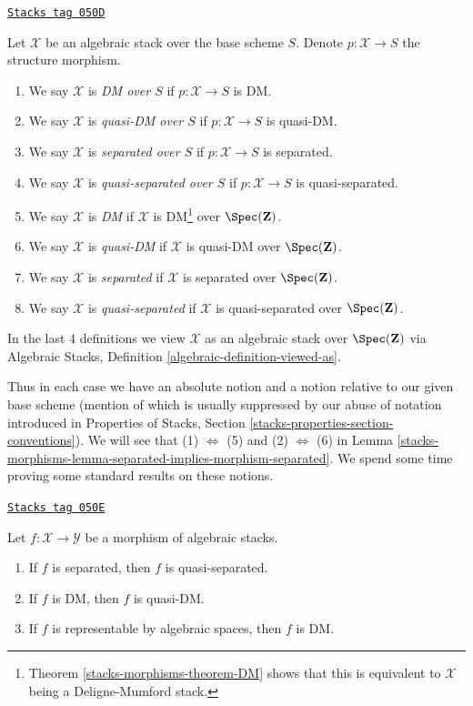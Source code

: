 \begin{definition}
\label{stacks-morphisms-definition-absolute-separated}
\href{https://stacks.math.columbia.edu/tag/050D}{\texttt{Stacks tag 050D}}

Let $\mathcal{X}$ be an algebraic stack over the base scheme $S$.
Denote $p : \mathcal{X} \to S$ the structure morphism.
\begin{enumerate}
\item We say $\mathcal{X}$ is {\it DM over $S$}
if $p : \mathcal{X} \to S$ is DM.
\item We say $\mathcal{X}$ is {\it quasi-DM over $S$}
if $p : \mathcal{X} \to S$ is quasi-DM.
\item We say $\mathcal{X}$ is {\it separated over $S$}
if $p : \mathcal{X} \to S$ is separated.
\item We say $\mathcal{X}$ is {\it quasi-separated over $S$} if
$p : \mathcal{X} \to S$ is quasi-separated.
\item We say $\mathcal{X}$ is {\it DM}
if $\mathcal{X}$ is DM\footnote{Theorem \ref{stacks-morphisms-theorem-DM} shows
that this is equivalent to $\mathcal{X}$ being a Deligne-Mumford stack.}
over $\Spec(\mathbf{Z})$.
\item We say $\mathcal{X}$ is {\it quasi-DM}
if $\mathcal{X}$ is quasi-DM over $\Spec(\mathbf{Z})$.
\item We say $\mathcal{X}$ is {\it separated} if $\mathcal{X}$
is separated over $\Spec(\mathbf{Z})$.
\item We say $\mathcal{X}$ is {\it quasi-separated} if $\mathcal{X}$
is quasi-separated over $\Spec(\mathbf{Z})$.
\end{enumerate}
In the last 4 definitions we view $\mathcal{X}$
as an algebraic stack over $\Spec(\mathbf{Z})$
via
Algebraic Stacks, Definition \ref{algebraic-definition-viewed-as}.
\end{definition}

Thus in each case we have an absolute notion and a notion relative to
our given base scheme (mention of which is usually suppressed by our
abuse of notation introduced in
Properties of Stacks, Section \ref{stacks-properties-section-conventions}).
We will see that (1) $\Leftrightarrow$ (5) and (2) $\Leftrightarrow$ (6) in
Lemma \ref{stacks-morphisms-lemma-separated-implies-morphism-separated}.
We spend some time proving some standard results on these notions.

\begin{lemma}
\label{stacks-morphisms-lemma-trivial-implications}
\href{https://stacks.math.columbia.edu/tag/050E}{\texttt{Stacks tag 050E}}

Let $f : \mathcal{X} \to \mathcal{Y}$ be a morphism of algebraic stacks.
\begin{enumerate}
\item If $f$ is separated, then $f$ is quasi-separated.
\item If $f$ is DM, then $f$ is quasi-DM.
\item If $f$ is representable by algebraic spaces, then $f$ is DM.
\end{enumerate}
\end{lemma}

